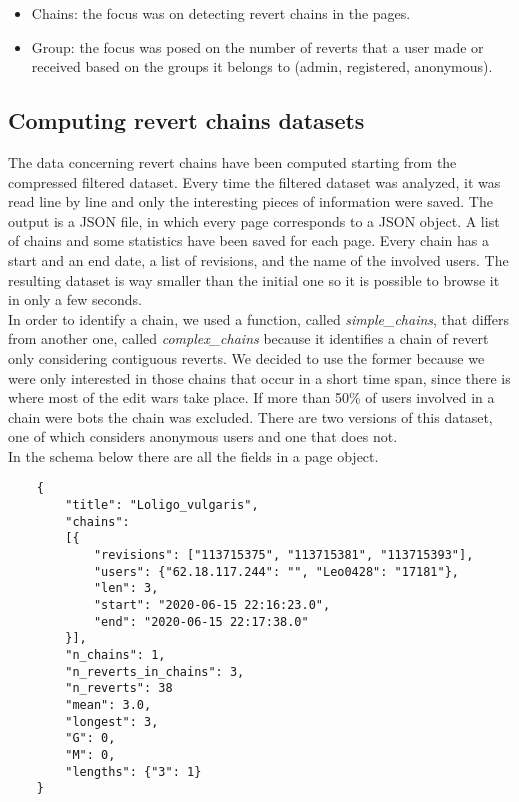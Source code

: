 \begin{itemize}
    \item Chains:  the focus was on detecting revert chains in the pages. 
    \item Group:  the focus was posed on the number of reverts that a user made or received based on the groups it belongs to (admin, registered, anonymous).
\end{itemize}

\subsection{Computing revert chains datasets}
The data concerning revert chains have been computed starting from the compressed filtered dataset. Every
time the filtered dataset was analyzed, it was read line by line and only the interesting
pieces of information were saved. The output is a JSON file, in which every page corresponds to a JSON object.
A list of chains and some statistics have been saved for each page. Every chain has a start and an end date, a
list of revisions, and the name of the involved users. The resulting dataset is way smaller than the initial one so it is
possible to browse it in only a few seconds.\\


In order to identify a chain, we used a function, called \textit{simple\_chains}, that differs from
another one, called \textit{complex\_chains} because it identifies a chain of revert only
considering contiguous reverts. We decided to use the former because we were only interested in
those chains that occur in a short time span, since there is where most of the edit wars take place.
If more than 50\% of users involved in a chain were bots the chain was excluded. There are two
versions of this dataset, one of which considers anonymous users and one that does not. \\

\clearpage
In the schema below there are all the fields in a page object. 

\begin{verbatim}
    {
        "title": "Loligo_vulgaris", 
        "chains": 
        [{
            "revisions": ["113715375", "113715381", "113715393"], 
            "users": {"62.18.117.244": "", "Leo0428": "17181"}, 
            "len": 3, 
            "start": "2020-06-15 22:16:23.0", 
            "end": "2020-06-15 22:17:38.0"
        }], 
        "n_chains": 1, 
        "n_reverts_in_chains": 3, 
        "n_reverts": 38
        "mean": 3.0, 
        "longest": 3, 
        "G": 0,
        "M": 0, 
        "lengths": {"3": 1}
    }
    
\end{verbatim}



